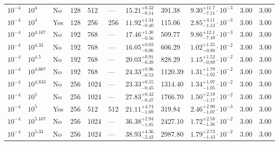 \documentclass[aps, prfluids, onecolumn, notitlepage, nofootinbib, groupedaddress, amsfonts, amssymb, amsmath]{revtex4-1}
\begin{document}
\begin{center}
\begin{longtable}{ p{1cm} p{1cm} p{1cm} p{1cm} p{1cm} p{1cm} p{1.75cm} p{1.5cm} p{2.75cm} p{1cm} p{1.2cm}  }
\vspace{0.08cm}$10^{-4}$	&	$10^4$	&	No	&	128	&	512	&	---	&$	15.21	_{-	0.14	}^{+	0.32	}$&	391.38	&$	9.30	_{-	7.11	}^{+	11.7}\cdot 10^{-3}	$&	3.00	&	3.00	\\
\vspace{0.08cm}$10^{-4}$	&	$10^4$	&	Yes	&	128	&	256	&	256	&$	11.92	_{-	0.40	}^{+	1.34	}$&	115.06	&$	2.85	_{-	1.13	}^{+	3.11}\cdot 10^{-3}	$&	3.00	&	3.00	\\
\vspace{0.08cm}$10^{-4}$	&	$10^{4.167}$	&	No	&	192	&	768	&	---	&$	17.46	_{-	0.56	}^{+	1.30	}$&	509.77	&$	9.86	_{-	7.49	}^{+	12.1}\cdot 10^{-3}	$&	3.00	&	3.00	\\
\vspace{0.08cm}$10^{-4}$	&	$10^{4.33}$	&	No	&	192	&	768	&	---	&$	16.05	_{-	0.06	}^{+	0.03	}$&	606.29	&$	1.02	_{-	0.80	}^{+	1.35}\cdot 10^{-2}	$&	3.00	&	3.00	\\
\vspace{0.08cm}$10^{-4}$	&	$10^{4.5}$	&	No	&	192	&	768	&	---	&$	20.03	_{-	0.39	}^{+	0.91	}$&	828.29	&$	1.15	_{-	0.89	}^{+	1.52}\cdot 10^{-2}	$&	3.00	&	3.00	\\
\vspace{0.08cm}$10^{-4}$	&	$10^{4.667}$	&	No	&	192	&	768	&	---	&$	24.33	_{-	0.53	}^{+	0.96	}$&	1120.39	&$	1.31	_{-	1.02	}^{+	1.79}\cdot 10^{-2}	$&	3.00	&	3.00	\\
\vspace{0.08cm}$10^{-4}$	&	$10^{4.833}$	&	No	&	256	&	1024	&	---	&$	23.33	_{-	0.45	}^{+	0.55	}$&	1314.40	&$	1.34	_{-	1.05	}^{+	1.97}\cdot 10^{-2}	$&	3.00	&	3.00	\\
\vspace{0.08cm}$10^{-4}$	&	$10^5$	&	No	&	256	&	1024	&	---	&$	27.83	_{-	0.47	}^{+	0.42	}$&	1766.70	&$	1.50	_{-	1.17	}^{+	2.19}\cdot 10^{-2}	$&	3.00	&	3.00	\\
\vspace{0.08cm}$10^{-4}$	&	$10^5$	&	Yes	&	256	&	512	&	512	&$	21.11	_{-	1.69	}^{+	4.74	}$&	319.84	&$	2.46	_{-	1.07	}^{+	2.90}\cdot 10^{-3}	$&	3.00	&	3.00	\\
\vspace{0.08cm}$10^{-4}$	&	$10^{5.167}$	&	No	&	256	&	1024	&	---	&$	36.38	_{-	1.85	}^{+	2.94	}$&	2427.10	&$	1.72	_{-	1.36	}^{+	2.58}\cdot 10^{-2}	$&	3.00	&	3.00	\\
\vspace{0.08cm}$10^{-4}$	&	$10^{5.33}$	&	No	&	256	&	1024	&	---	&$	38.93	_{-	2.43	}^{+	4.36	}$&	2987.80	&$	1.79	_{-	1.43	}^{+	2.73}\cdot 10^{-2}	$&	3.00	&	3.00	\\

\end{longtable}
\end{center}
\end{document}
